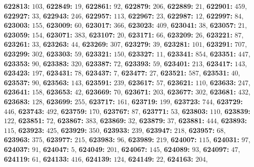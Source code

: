 \textsf{\bfseries 622813:} $103$, \textsf{\bfseries 622849:} $19$, \textsf{\bfseries 622861:} $92$, \textsf{\bfseries 622879:} $206$, \textsf{\bfseries 622889:} $21$, \textsf{\bfseries 622901:} $459$, \textsf{\bfseries 622927:} $33$, \textsf{\bfseries 622943:} $246$, \textsf{\bfseries 622957:} $113$, \textsf{\bfseries 622967:} $23$, \textsf{\bfseries 622987:} $12$, \textsf{\bfseries 622997:} $84$, \textsf{\bfseries 623003:} $155$, \textsf{\bfseries 623009:} $60$, \textsf{\bfseries 623017:} $366$, \textsf{\bfseries 623023:} $409$, \textsf{\bfseries 623041:} $38$, \textsf{\bfseries 623057:} $21$, \textsf{\bfseries 623059:} $154$, \textsf{\bfseries 623071:} $383$, \textsf{\bfseries 623107:} $20$, \textsf{\bfseries 623171:} $66$, \textsf{\bfseries 623209:} $26$, \textsf{\bfseries 623221:} $87$, \textsf{\bfseries 623261:} $33$, \textsf{\bfseries 623263:} $44$, \textsf{\bfseries 623269:} $307$, \textsf{\bfseries 623279:} $39$, \textsf{\bfseries 623281:} $101$, \textsf{\bfseries 623291:} $707$, \textsf{\bfseries 623299:} $302$, \textsf{\bfseries 623303:} $59$, \textsf{\bfseries 623321:} $150$, \textsf{\bfseries 623327:} $11$, \textsf{\bfseries 623341:} $854$, \textsf{\bfseries 623351:} $447$, \textsf{\bfseries 623353:} $90$, \textsf{\bfseries 623383:} $320$, \textsf{\bfseries 623387:} $72$, \textsf{\bfseries 623393:} $59$, \textsf{\bfseries 623401:} $213$, \textsf{\bfseries 623417:} $143$, \textsf{\bfseries 623423:} $197$, \textsf{\bfseries 623431:} $78$, \textsf{\bfseries 623437:} $7$, \textsf{\bfseries 623477:} $27$, \textsf{\bfseries 623521:} $587$, \textsf{\bfseries 623531:} $40$, \textsf{\bfseries 623537:} $90$, \textsf{\bfseries 623563:} $143$, \textsf{\bfseries 623591:} $239$, \textsf{\bfseries 623617:} $57$, \textsf{\bfseries 623621:} $110$, \textsf{\bfseries 623633:} $247$, \textsf{\bfseries 623641:} $158$, \textsf{\bfseries 623653:} $42$, \textsf{\bfseries 623669:} $70$, \textsf{\bfseries 623671:} $203$, \textsf{\bfseries 623677:} $302$, \textsf{\bfseries 623681:} $432$, \textsf{\bfseries 623683:} $128$, \textsf{\bfseries 623699:} $255$, \textsf{\bfseries 623717:} $161$, \textsf{\bfseries 623719:} $199$, \textsf{\bfseries 623723:} $744$, \textsf{\bfseries 623729:} $446$, \textsf{\bfseries 623743:} $492$, \textsf{\bfseries 623759:} $170$, \textsf{\bfseries 623767:} $87$, \textsf{\bfseries 623771:} $53$, \textsf{\bfseries 623803:} $110$, \textsf{\bfseries 623839:} $122$, \textsf{\bfseries 623851:} $72$, \textsf{\bfseries 623867:} $383$, \textsf{\bfseries 623869:} $32$, \textsf{\bfseries 623879:} $37$, \textsf{\bfseries 623881:} $444$, \textsf{\bfseries 623893:} $115$, \textsf{\bfseries 623923:} $425$, \textsf{\bfseries 623929:} $350$, \textsf{\bfseries 623933:} $239$, \textsf{\bfseries 623947:} $218$, \textsf{\bfseries 623957:} $68$, \textsf{\bfseries 623963:} $375$, \textsf{\bfseries 623977:} $215$, \textsf{\bfseries 623983:} $96$, \textsf{\bfseries 623989:} $219$, \textsf{\bfseries 624007:} $115$, \textsf{\bfseries 624031:} $97$, \textsf{\bfseries 624037:} $91$, \textsf{\bfseries 624047:} $5$, \textsf{\bfseries 624049:} $201$, \textsf{\bfseries 624067:} $145$, \textsf{\bfseries 624089:} $93$, \textsf{\bfseries 624097:} $47$, \textsf{\bfseries 624119:} $61$, \textsf{\bfseries 624133:} $416$, \textsf{\bfseries 624139:} $124$, \textsf{\bfseries 624149:} $22$, \textsf{\bfseries 624163:} $204$, 
